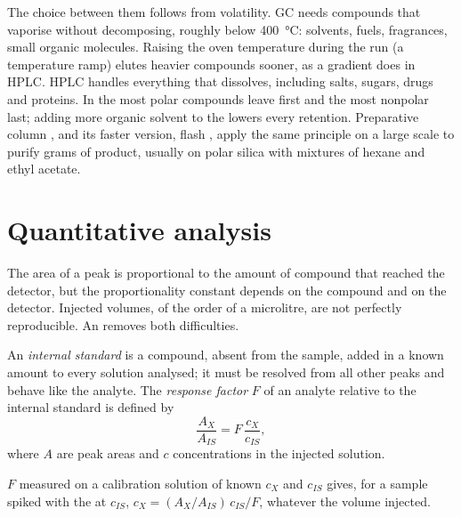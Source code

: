 The choice between them follows from volatility. GC needs compounds that vaporise without decomposing,
roughly below \qty{400}{\degreeCelsius}: solvents, fuels, fragrances, small organic molecules. Raising
the oven temperature during the run (a temperature ramp) elutes heavier compounds sooner, as a gradient
does in HPLC. HPLC handles everything that dissolves, including salts, sugars, drugs and proteins. In
 the most polar compounds leave first and the most nonpolar last; adding more organic
solvent to the  lowers every retention. Preparative column , and its faster
version, flash , apply the same principle on a large scale to purify grams of product,
usually on polar silica with mixtures of hexane and ethyl acetate.

\section{Quantitative analysis}

The area of a peak is proportional to the amount of compound that reached the detector, but the
proportionality constant depends on the compound and on the detector. Injected volumes, of the order of
a microlitre, are not perfectly reproducible. An  removes both difficulties.

\begin{definition}\label{def:b2:chromatography:quantitative}
An \emph{internal standard} is a compound, absent from the sample, added in a
known amount to every solution analysed; it must be resolved from all other peaks and behave like the
analyte. The \emph{response factor} $F$ of an analyte relative to the internal
standard is defined by
\begin{equation*}
\frac{A_X}{A_{IS}} = F\,\frac{c_X}{c_{IS}},
\end{equation*}
where $A$ are peak areas and $c$ concentrations in the injected solution.
\end{definition}

\begin{proposition}\label{prop:b2:chromatography:internal-standard}
$F$ measured on a calibration solution of known $c_X$ and $c_{IS}$ gives, for a sample spiked with the
 at $c_{IS}$, $c_X = (A_X/A_{IS})\,c_{IS}/F$, whatever the volume injected.
\end{proposition}

